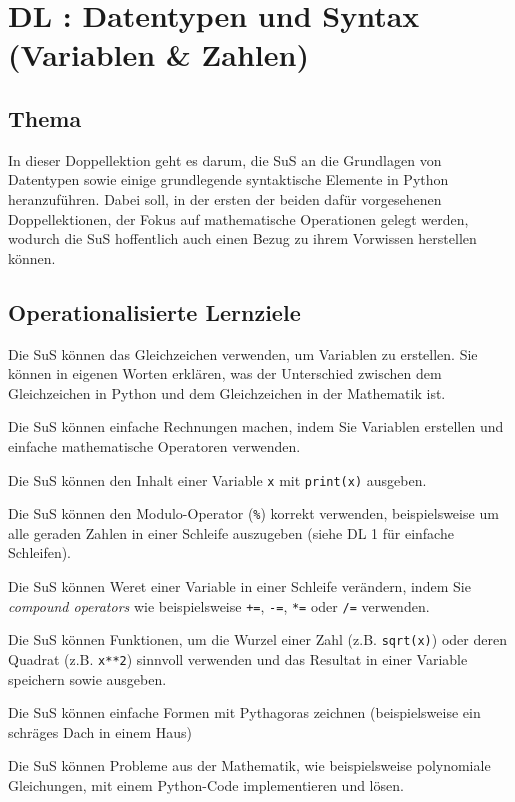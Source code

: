 \section{DL \themycounter: Datentypen und Syntax (Variablen \& Zahlen)}
\begin{myExBox}[title=DL \themycounter]
\subsection*{Thema}
In dieser Doppellektion geht es darum, die SuS an die Grundlagen von Datentypen sowie einige grundlegende syntaktische Elemente in Python heranzuführen. Dabei soll, in der ersten der beiden dafür vorgesehenen Doppellektionen, der Fokus auf mathematische Operationen gelegt werden, wodurch die SuS hoffentlich auch einen Bezug zu ihrem Vorwissen herstellen können.

\subsection*{Operationalisierte Lernziele}
\begin{todolist}
    \item Die SuS können das Gleichzeichen verwenden, um Variablen zu erstellen. Sie können in eigenen Worten erklären, was der Unterschied zwischen dem Gleichzeichen in Python und dem Gleichzeichen in der Mathematik ist.
    \item Die SuS können einfache Rechnungen machen, indem Sie Variablen erstellen und einfache mathematische Operatoren verwenden.
    \item Die SuS können den Inhalt einer Variable \lstinline|x| mit \lstinline|print(x)| ausgeben.
    \item Die SuS können den Modulo-Operator (\lstinline|%|) korrekt verwenden, beispielsweise um alle geraden Zahlen in einer Schleife auszugeben  (siehe DL 1 für einfache Schleifen).
    \item Die SuS können Weret einer Variable in einer Schleife verändern, indem Sie \textit{compound operators} wie beispielsweise \lstinline|+=|, \lstinline|-=|, \lstinline|*=| oder \lstinline|/=| verwenden.
    \item Die SuS können Funktionen, um die Wurzel einer Zahl (z.B. \lstinline|sqrt(x)|) oder deren Quadrat (z.B. \lstinline|x**2|) sinnvoll verwenden und das Resultat in einer Variable speichern sowie ausgeben.
    \item Die SuS können einfache Formen mit Pythagoras zeichnen (beispielsweise ein schräges Dach in einem Haus)
    \item Die SuS können Probleme aus der Mathematik, wie beispielsweise polynomiale Gleichungen, mit einem Python-Code implementieren und lösen.
\end{todolist}


\end{myExBox}

